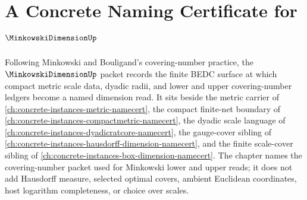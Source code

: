 \chapter{A Concrete Naming Certificate for $\MinkowskiDimensionUp$}
\label{ch:concrete-instances-minkowski-dimension-namecert}

Following Minkowski and Bouligand's covering-number practice, the $\MinkowskiDimensionUp$ packet records the finite BEDC surface at which compact metric scale data, dyadic radii, and lower and upper covering-number ledgers become a named dimension read. It sits beside the metric carrier of \autoref{ch:concrete-instances-metric-namecert}, the compact finite-net boundary of \autoref{ch:concrete-instances-compactmetric-namecert}, the dyadic scale language of \autoref{ch:concrete-instances-dyadicratcore-namecert}, the gauge-cover sibling of \autoref{ch:concrete-instances-hausdorff-dimension-namecert}, and the finite scale-cover sibling of \autoref{ch:concrete-instances-box-dimension-namecert}. The chapter names the covering-number packet used for Minkowski lower and upper reads; it does not add Hausdorff measure, selected optimal covers, ambient Euclidean coordinates, host logarithm completeness, or choice over scales.

